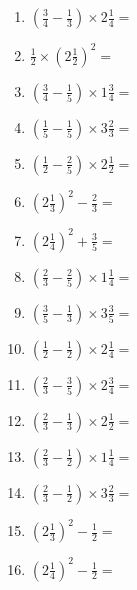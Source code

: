 \documentclass[12pt]{article}
\begin{document}
\begin{enumerate}
\newpage
\item \large $ \left( \frac{3}{4} - \frac{1}{3} \right) \times 2 \frac{1}{4} = $ \vspace{1.6cm}
\item \large $ \frac{1}{2} \times \left( 2 \frac{1}{2} \right)^2 = $ \vspace{1.6cm}
\item \large $ \left( \frac{3}{4} - \frac{1}{5} \right) \times 1 \frac{3}{4} = $ \vspace{1.6cm}
\item \large $ \left( \frac{1}{5} - \frac{1}{5} \right) \times 3 \frac{2}{3} = $ \vspace{1.6cm}
\item \large $ \left( \frac{1}{2} - \frac{2}{5} \right) \times 2 \frac{1}{2} = $ \vspace{1.6cm}
\item \large $ \left( 2 \frac{1}{3} \right)^2 - \frac{2}{3} = $ \vspace{1.6cm}
\item \large $ \left( 2 \frac{1}{4} \right)^2 + \frac{3}{5} = $ \vspace{1.6cm}
\item \large $ \left( \frac{2}{3} - \frac{2}{5} \right) \times 1 \frac{1}{4} = $ \vspace{1.6cm}
\item \large $ \left( \frac{3}{5} - \frac{1}{3} \right) \times 3 \frac{3}{5} = $ \vspace{1.6cm}
\item \large $ \left( \frac{1}{2} - \frac{1}{2} \right) \times 2 \frac{1}{4} = $ \vspace{1.6cm}
\newpage
\item \large $ \left( \frac{2}{3} - \frac{3}{5} \right) \times 2 \frac{3}{4} = $ \vspace{1.6cm}
\item \large $ \left( \frac{2}{3} - \frac{1}{3} \right) \times 2 \frac{1}{2} = $ \vspace{1.6cm}
\item \large $ \left( \frac{2}{3} - \frac{1}{2} \right) \times 1 \frac{1}{4} = $ \vspace{1.6cm}
\item \large $ \left( \frac{2}{3} - \frac{1}{2} \right) \times 3 \frac{2}{3} = $ \vspace{1.6cm}
\item \large $ \left( 2 \frac{1}{3} \right)^2 - \frac{1}{2} = $ \vspace{1.6cm}
\item \large $ \left( 2 \frac{1}{4} \right)^2 - \frac{1}{2} = $ \vspace{1.6cm}

\end{enumerate}
\end{document}

